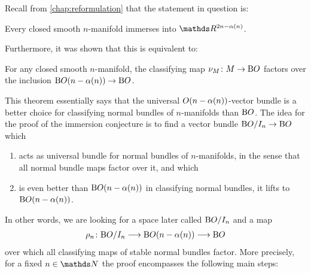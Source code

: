Recall from \autoref{chap:reformulation} that the statement in
question is:
\begin{Thm*}
  Every closed smooth $n$-manifold immerses into
  $\R^{2n-\alpha(n)}$.
\end{Thm*}
Furthermore, it was shown that this is equivalent to:
\begin{Thm*}
  For any closed smooth $n$-manifold,
  the classifying map $\nu_{M}\colon M\to\mathrm{B}O$ factors over the
  inclusion $\mathrm{B}O(n-\alpha(n))\to\mathrm{B}O$.
\end{Thm*}
This theorem essentially says that the universal
$O(n-\alpha(n))$-vector bundle is a better choice for
classifying normal bundles of $n$-manifolds than
$\mathrm{B}O$.
The idea for the proof of the immersion conjecture is to
find a vector bundle $\mathrm{B}O/I_{n}\to\mathrm{B}O$ which
\begin{enumerate}[1.]
\item
  acts as universal bundle for normal bundles of $n$-manifolds, in
  the sense that all normal bundle maps factor over it, and which
\item
  is even better than $\mathrm{B}O(n-\alpha(n))$ in classifying normal
  bundles, \idest it lifts to $\mathrm{B}O(n-\alpha(n))$.
\end{enumerate}
In other words, we are looking for a space later called $\mathrm{B}O/I_{n}$
and a map
\begin{gather*}
  \rho_n\colon \mathrm{B}O/I_{n}\longrightarrow\mathrm{B}O(n-\alpha(n))\longrightarrow\mathrm{B}O
\end{gather*}
over which all classifying maps of stable normal bundles factor.
More precisely, for a fixed $n\in\Nat$ the proof
encompasses the following main steps:

